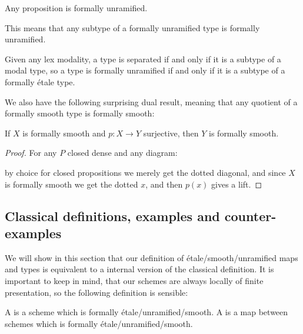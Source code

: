 \begin{lemma}\label{prop-are-unramified}
Any proposition is formally unramified.
\end{lemma}

This means that any subtype of a formally unramified type is formally unramified.

\begin{remark}
  Given any lex modality, a type is separated if and only if it is a subtype of a modal type,
  so a type is formally unramified if and only if it is a subtype of a formally étale type.
\end{remark}

We also have the following surprising dual result, meaning that any quotient of a formally smooth type is formally smooth:

\begin{proposition}\label{smoothSurjective}
If $X$ is formally smooth and $p:X\to Y$ surjective, then $Y$ is formally smooth.
\end{proposition}

\begin{proof}
For any $P$ closed dense and any diagram:
 \begin{center}
    \end{center} 
    by choice for closed propositions we merely get the dotted diagonal, and since $X$ is formally smooth we get the dotted $x$, and then $p(x)$ gives a lift.
\end{proof}


\subsection{Classical definitions, examples and counter-examples}

We will show in this section that our definition of étale/smooth/unramified maps and types is equivalent to a internal version of the classical definition. It is important to keep in mind, that our schemes are always locally of finite presentation, so the following definition is sensible:

\begin{definition}
  A  is a scheme which is formally étale/unramified/smooth.
  A  is a map between schemes which is formally étale/unramified/smooth.
\end{definition}

